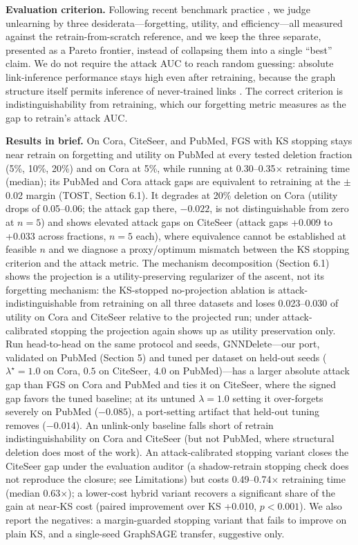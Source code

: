 \documentclass[pdflatex,sn-basic,Numbered]{sn-jnl}
\begin{document}
\textbf{Evaluation criterion.} Following recent benchmark practice \cite{jain2026}, we judge unlearning by three desiderata---forgetting, utility, and efficiency---all measured against the retrain-from-scratch reference, and we keep the three separate, presented as a Pareto frontier, instead of collapsing them into a single ``best'' claim. We do not require the attack AUC to reach random guessing: absolute link-inference performance stays high even after retraining, because the graph structure itself permits inference of never-trained links \cite{utu2024}. The correct criterion is indistinguishability from retraining, which our forgetting metric measures as the gap to retrain's attack AUC.

\textbf{Results in brief.} On Cora, CiteSeer, and PubMed, FGS with KS stopping stays near retrain on forgetting and utility on PubMed at every tested deletion fraction (5\%, 10\%, 20\%) and on Cora at 5\%, while running at 0.30--0.35$\times$ retraining time (median); its PubMed and Cora attack gaps are equivalent to retraining at the $\pm$0.02 margin (TOST, Section 6.1). It degrades at 20\% deletion on Cora (utility drops of 0.05--0.06; the attack gap there, $-0.022$, is not distinguishable from zero at $n = 5$) and shows elevated attack gaps on CiteSeer (attack gaps +0.009 to +0.033 across fractions, $n = 5$ each), where equivalence cannot be established at feasible $n$ and we diagnose a proxy/optimum mismatch between the KS stopping criterion and the attack metric. The mechanism decomposition (Section 6.1) shows the projection is a utility-preserving regularizer of the ascent, not its forgetting mechanism: the KS-stopped no-projection ablation is attack-indistinguishable from retraining on all three datasets and loses 0.023--0.030 of utility on Cora and CiteSeer relative to the projected run; under attack-calibrated stopping the projection again shows up as utility preservation only. Run head-to-head on the same protocol and seeds, GNNDelete---our port, validated on PubMed (Section 5) and tuned per dataset on held-out seeds ($\lambda^\star = 1.0$ on Cora, $0.5$ on CiteSeer, $4.0$ on PubMed)---has a larger absolute attack gap than FGS on Cora and PubMed and ties it on CiteSeer, where the signed gap favors the tuned baseline; at its untuned $\lambda = 1.0$ setting it over-forgets severely on PubMed ($-0.085$), a port-setting artifact that held-out tuning removes ($-0.014$). An unlink-only baseline falls short of retrain indistinguishability on Cora and CiteSeer (but not PubMed, where structural deletion does most of the work). An attack-calibrated stopping variant closes the CiteSeer gap under the evaluation auditor (a shadow-retrain stopping check does not reproduce the closure; see Limitations) but costs 0.49--0.74$\times$ retraining time (median 0.63$\times$); a lower-cost hybrid variant recovers a significant share of the gain at near-KS cost (paired improvement over KS +0.010, $p < 0.001$). We also report the negatives: a margin-guarded stopping variant that fails to improve on plain KS, and a single-seed GraphSAGE transfer, suggestive only.
\end{document}
